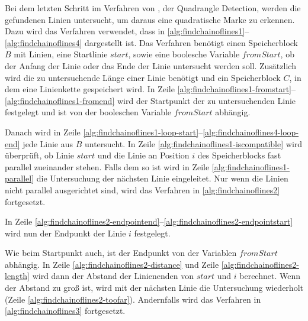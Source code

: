 Bei dem letzten Schritt im Verfahren von \citeauthor{hirzer08}, der Quadrangle Detection, werden die gefundenen Linien
 untersucht, um daraus eine quadratische Marke zu erkennen. Dazu wird das Verfahren 
 verwendet, dass in \autoref{alg:findchainoflines1}--\autoref{alg:findchainoflines4} dargestellt ist. Das Verfahren
 benötigt einen Speicherblock $B$ mit Linien, eine Startlinie $\mathit{start}$, sowie eine boolesche Variable
 $\mathit{fromStart}$, ob der Anfang der Linie oder das Ende der Linie untersucht werden soll. Zusätzlich wird die zu
 untersuchende Länge einer Linie benötigt und ein Speicherblock $C$, in dem eine Linienkette gespeichert wird. In Zeile
 \ref{alg:findchainoflines1-fromstart}--\ref{alg:findchainoflines1-fromend} wird der Startpunkt der zu
 untersuchenden Linie festgelegt und ist von der booleschen Variable $\mathit{fromStart}$ abhängig.

Danach wird in Zeile \ref{alg:findchainoflines1-loop-start}--\ref{alg:findchainoflines4-loop-end} jede Linie aus $B$
 untersucht. In Zeile \ref{alg:findchainoflines1-iscompatible} wird überprüft, ob Linie $\mathit{start}$ und die Linie
 an Position $i$ des Speicherblocks fast parallel zueinander stehen. Falls dem so ist wird in Zeile
 \ref{alg:findchainoflines1-parallel} die Untersuchung der nächsten Linie eingeleitet. Nur wenn die Linien nicht
 parallel ausgerichtet sind, wird das Verfahren in \autoref{alg:findchainoflines2} fortgesetzt.

In Zeile \ref{alg:findchainoflines2-endpointend}--\ref{alg:findchainoflines2-endpointstart} wird nun der Endpunkt der
 Linie $i$ festgelegt.

Wie beim Startpunkt auch, ist der Endpunkt von der Variablen $\mathit{fromStart}$ abhängig. In Zeile
 \ref{alg:findchainoflines2-distance} und Zeile \ref{alg:findchainoflines2-length} wird dann der Abstand der
 Linienenden von $\mathit{start}$ und $i$ berechnet. Wenn der Abstand zu groß ist, wird mit der nächsten Linie die
 Untersuchung wiederholt (Zeile \ref{alg:findchainoflines2-toofar}). Andernfalls wird das Verfahren in
 \autoref{alg:findchainoflines3} fortgesetzt.

